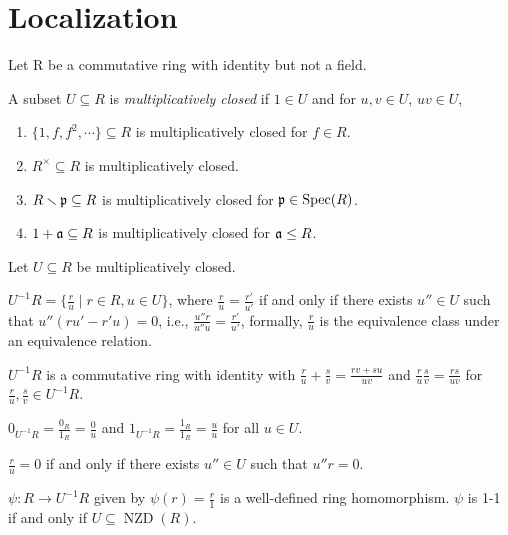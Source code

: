 \chapter{Localization}

Let R be a commutative ring with identity but not a field.

\begin{recall}\label{3.1}
    A subset $U \subseteq R$ is \emph{multiplicatively closed} if $1 \in U$ and for $u,v \in U$, $uv \in U$, 
\end{recall}

\begin{example}\label{3.2}
    \begin{enumerate}
        \item $\{1,f,f^2,\cdots\} \subseteq R$ is multiplicatively closed for $f \in R$.
        \item $R^\times \subseteq R$ is multiplicatively closed.
        \item $R \smallsetminus \mathfrak{p} \subseteq R$ is multiplicatively closed for $\mathfrak{p} \in \operatorname{Spec}(R)$.
        \item $1 + \mathfrak{a} \subseteq R$ is multiplicatively closed for $\mathfrak{a} \leq R$.
    \end{enumerate}
\end{example}

\noindent Let $U \subseteq R$ be multiplicatively closed.

\begin{recall}\label{3.3}
    $U^{-1}R = \{\frac{r}{u} \mid r \in R, u \in U\}$, where $\frac{r}{u} = \frac{r'}{u'}$ if and only if there exists $u'' \in U$ such that $u''(ru'-r'u) = 0$, i.e., $\frac{u''r}{u''u} = \frac{r'}{u'}$, formally, $\frac{r}{u}$ is the equivalence class under an equivalence relation. \par 
    $U^{-1}R$ is a commutative ring with identity with $\frac{r}{u} + \frac{s}{v} = \frac{rv+su}{uv}$ and $\frac{r}{u} \frac{s}{v} = \frac{rs}{uv}$ for $\frac{r}{u},\frac{s}{v} \in U^{-1}R$. \par 
    $0_{U^{-1}R} = \frac{0_R}{1_R} = \frac{0}{u}$ and $1_{U^{-1}R} = \frac{1_{R}}{1_{R}} = \frac{u}{u}$ for all $u \in U$. \par 
    $\frac{r}{u} = 0$ if and only if there exists $u'' \in U$ such that $u''r = 0$. \par 
    $\psi: R \to U^{-1}R$ given by $\psi(r) = \frac{r}{1}$ is a well-defined ring homomorphism. $\psi$ is 1-1 if and only if $U \subseteq \operatorname{NZD}(R)$. 
\end{recall}

